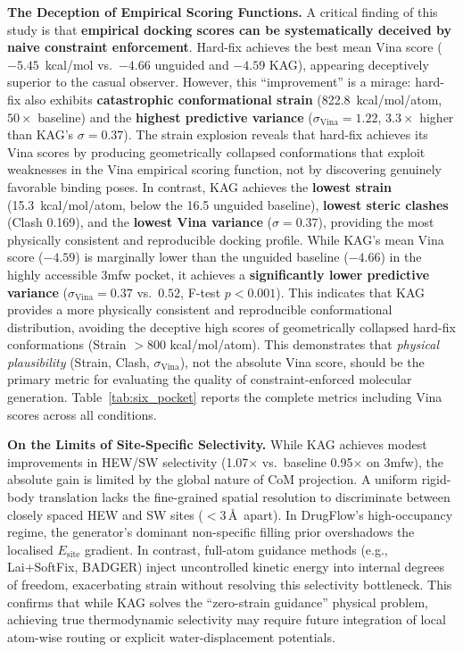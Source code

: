\documentclass{article}
\begin{document}
\textbf{The Deception of Empirical Scoring Functions.}
A critical finding of this study is that \textbf{empirical docking scores
can be systematically deceived by naive constraint enforcement}.
Hard-fix achieves the best mean Vina score ($-5.45$~kcal/mol vs.\ $-4.66$
unguided and $-4.59$ KAG), appearing deceptively superior to the casual
observer.  However, this ``improvement'' is a mirage: hard-fix also exhibits
\textbf{catastrophic conformational strain} (822.8~kcal/mol/atom, $50\times$
baseline) and the \textbf{highest predictive variance} ($\sigma_{\text{Vina}}
= 1.22$, $3.3\times$ higher than KAG's $\sigma = 0.37$).  The strain
explosion reveals that hard-fix achieves its Vina scores by producing
geometrically collapsed conformations that exploit weaknesses in the Vina
empirical scoring function, not by discovering genuinely favorable binding
poses.  In contrast, KAG achieves the \textbf{lowest strain} (15.3~kcal/mol/atom,
below the 16.5 unguided baseline), \textbf{lowest steric clashes} (Clash
0.169), and the \textbf{lowest Vina variance} ($\sigma=0.37$), providing
the most physically consistent and reproducible docking profile.
While KAG's mean Vina score ($-4.59$) is marginally lower than the unguided
baseline ($-4.66$) in the highly accessible 3mfw pocket, it achieves a
\textbf{significantly lower predictive variance}
($\sigma_{\text{Vina}} = 0.37$ vs.\ $0.52$, F-test $p < 0.001$).  This
indicates that KAG provides a more physically consistent and reproducible
conformational distribution, avoiding the deceptive high scores of
geometrically collapsed hard-fix conformations (Strain $> 800$
kcal/mol/atom).  This demonstrates that \emph{physical plausibility}
(Strain, Clash, $\sigma_{\text{Vina}}$), not the absolute Vina score,
should be the primary metric for evaluating the quality of
constraint-enforced molecular generation.
Table~\ref{tab:six_pocket} reports the complete metrics including Vina
scores across all conditions.

\textbf{On the Limits of Site-Specific Selectivity.}
While KAG achieves modest improvements in HEW/SW selectivity (1.07$\times$
vs.\ baseline 0.95$\times$ on 3mfw), the absolute gain is limited by the
global nature of CoM projection.  A uniform rigid-body translation lacks
the fine-grained spatial resolution to discriminate between closely spaced
HEW and SW sites ($<3$\,\AA\ apart).  In DrugFlow's high-occupancy regime,
the generator's dominant non-specific filling prior overshadows the
localised $E_{\text{site}}$ gradient.  In contrast, full-atom guidance
methods (e.g., Lai+SoftFix, BADGER) inject uncontrolled kinetic energy
into internal degrees of freedom, exacerbating strain without resolving
this selectivity bottleneck.  This confirms that while KAG solves the
``zero-strain guidance'' physical problem, achieving true thermodynamic
selectivity may require future integration of local atom-wise routing or
explicit water-displacement potentials.
\end{document}
